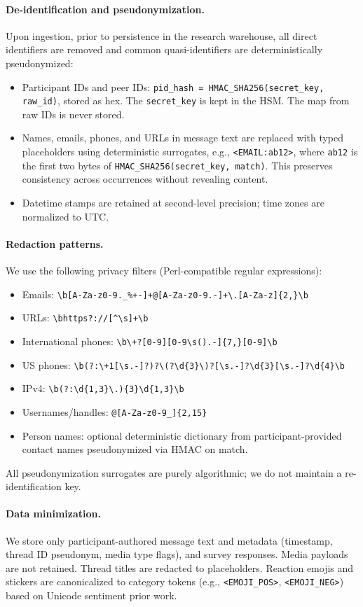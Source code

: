 \paragraph{De-identification and pseudonymization.} Upon ingestion, prior to persistence in the research warehouse, all direct identifiers are removed and common quasi-identifiers are deterministically pseudonymized:
\begin{itemize}
  \item Participant IDs and peer IDs: \verb|pid_hash = HMAC_SHA256(secret_key, raw_id)|, stored as hex. The \verb|secret_key| is kept in the HSM. The map from raw IDs is never stored.
  \item Names, emails, phones, and URLs in message text are replaced with typed placeholders using deterministic surrogates, e.g., \verb|<EMAIL:ab12>|, where \verb|ab12| is the first two bytes of \verb|HMAC_SHA256(secret_key, match)|. This preserves consistency across occurrences without revealing content.
  \item Datetime stamps are retained at second-level precision; time zones are normalized to UTC.
\end{itemize}

\paragraph{Redaction patterns.} We use the following privacy filters (Perl-compatible regular expressions):
\begin{itemize}
  \item Emails: \verb|\b[A-Za-z0-9._%+-]+@[A-Za-z0-9.-]+\.[A-Za-z]{2,}\b|
  \item URLs: \verb|\bhttps?://[^\s]+\b|
  \item International phones: \verb|\b\+?[0-9][0-9\s().-]{7,}[0-9]\b|
  \item US phones: \verb|\b(?:\+1[\s.-]?)?\(?\d{3}\)?[\s.-]?\d{3}[\s.-]?\d{4}\b|
  \item IPv4: \verb|\b(?:\d{1,3}\.){3}\d{1,3}\b|
  \item Usernames/handles: \verb|@[A-Za-z0-9_]{2,15}|
  \item Person names: optional deterministic dictionary from participant-provided contact names pseudonymized via HMAC on match.
\end{itemize}
All pseudonymization surrogates are purely algorithmic; we do not maintain a re-identification key.

\paragraph{Data minimization.} We store only participant-authored message text and metadata (timestamp, thread ID pseudonym, media type flags), and survey responses. Media payloads are not retained. Thread titles are redacted to placeholders. Reaction emojis and stickers are canonicalized to category tokens (e.g., \verb|<EMOJI_POS>|, \verb|<EMOJI_NEG>|) based on Unicode sentiment prior work.

